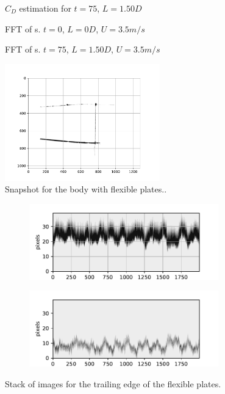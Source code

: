 \documentclass[12pt,a4paper,twocolumn]{article}
\begin{document}
		\begin{figure}
		\centering\resizebox{.495\textwidth}{!}{%
			}
		\caption{$C_D$ estimation for $t=75$, $L=1.50 D$}\label{fig:CD}
	\end{figure}
		\begin{figure}
		\centering\resizebox{.495\textwidth}{!}{%
			}
		\caption{FFT of s. $t=0$, $L=0 D$, $U = 3.5m/s$}\label{fig:FD_fourier}
	\end{figure}
	
			\begin{figure}
		\centering\resizebox{.495\textwidth}{!}{%
			}
		\caption{FFT of s. $t=75$, $L=1.50 D$, $U = 3.5m/s$}
	\end{figure}
	\begin{figure} 
		\includegraphics[width=0.6\textwidth]{	tikzs/def_075_L150_V40.pdf}	
 
	\caption{Snapshot for the body with  flexible plates..}\label{fig:snapshot}
\end{figure}

	\begin{figure}\begin{subfigure}{.49\textwidth}
		\includegraphics[width=0.9\textwidth]{tikzs/stack_t075_L150_V40_a}	
		\caption{}
		\end{subfigure}
		\begin{subfigure}{.49\textwidth}
		\includegraphics[width=0.9\textwidth]{tikzs/stack_t075_L150_V40_b}	
			\caption{}
		\end{subfigure}
		\caption{Stack of images for the trailing edge of the flexible plates.}\label{fig:stack}
	\end{figure}
	
\end{document}
